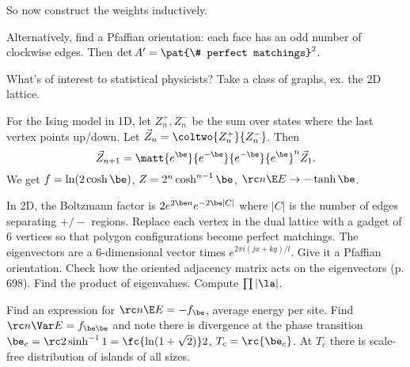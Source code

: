 So now construct the weights inductively.

Alternatively, find a Pfaffian orientation: each face has an odd number of clockwise edges. Then $\det A'=\pat{\# perfect matchings}^2$.

What's of interest to statistical physicists? Take a class of graphs, ex. the 2D lattice.
For the Ising model in 1D,
let $Z_n^+,Z_n^-$ be the sum over states where the last vertex points up/down. Let $\vec Z_n = \coltwo{Z_n^+}{Z_n^-}$. Then
\[
\vec Z_{n+1} = \matt{e^\be}{e^{-\be}}{e^{-\be}}{e^\be}^n\vec Z_1.
\]
We get $f=\ln (2\cosh\be)$, $Z=2^n\cosh^{n-1}\be$, $\rc n\E E\to -\tanh\be$.

In 2D, the Boltzmann factor is $2e^{2\be n}e^{-2\be|C|}$ where $|C|$ is the number of edges separating $+/-$ regions. Replace each vertex in the dual lattice with a gadget of 6 vertices so that polygon configurations become perfect matchings. 
The eigenvectors are a 6-dimensional vector times $e^{2\pi i(jx+ky)/l}$. Give it a Pfaffian orientation. Check how the oriented adjacency matrix acts on the eigenvectors (p. 698). Find the product of eigenvalues. Compute $\prod|\la|$. 

Find an expression for $\rc n\E E=-f_\be$, average energy per site. Find $\rc n\Var E=f_{\be\be}$ and note there is divergence at the phase transition $\be_c=\rc2\sinh^{-1}1=\fc{\ln(1+\sqrt2)}2$, $T_c=\rc{\be_c}$. At $T_c$ there is scale-free distribution of islands of all sizes.